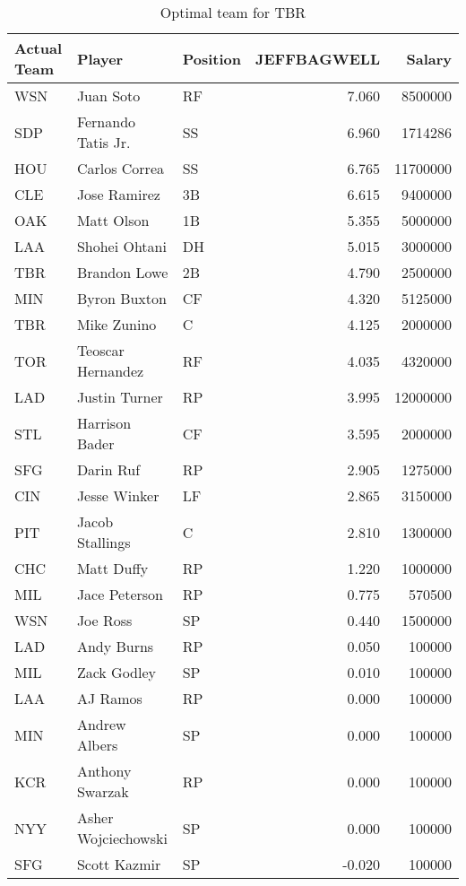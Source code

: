 \begin{table}

\caption{Optimal team for TBR}
\centering
\begin{tabular}[t]{l|l|l|r|r}
\hline
Actual Team & Player & Position & JEFFBAGWELL & Salary\\
\hline
WSN & Juan Soto & RF & 7.060 & 8500000\\
\hline
SDP & Fernando Tatis Jr. & SS & 6.960 & 1714286\\
\hline
HOU & Carlos Correa & SS & 6.765 & 11700000\\
\hline
CLE & Jose Ramirez & 3B & 6.615 & 9400000\\
\hline
OAK & Matt Olson & 1B & 5.355 & 5000000\\
\hline
LAA & Shohei Ohtani & DH & 5.015 & 3000000\\
\hline
TBR & Brandon Lowe & 2B & 4.790 & 2500000\\
\hline
MIN & Byron Buxton & CF & 4.320 & 5125000\\
\hline
TBR & Mike Zunino & C & 4.125 & 2000000\\
\hline
TOR & Teoscar Hernandez & RF & 4.035 & 4320000\\
\hline
LAD & Justin Turner & RP & 3.995 & 12000000\\
\hline
STL & Harrison Bader & CF & 3.595 & 2000000\\
\hline
SFG & Darin Ruf & RP & 2.905 & 1275000\\
\hline
CIN & Jesse Winker & LF & 2.865 & 3150000\\
\hline
PIT & Jacob Stallings & C & 2.810 & 1300000\\
\hline
CHC & Matt Duffy & RP & 1.220 & 1000000\\
\hline
MIL & Jace Peterson & RP & 0.775 & 570500\\
\hline
WSN & Joe Ross & SP & 0.440 & 1500000\\
\hline
LAD & Andy Burns & RP & 0.050 & 100000\\
\hline
MIL & Zack Godley & SP & 0.010 & 100000\\
\hline
LAA & AJ Ramos & RP & 0.000 & 100000\\
\hline
MIN & Andrew Albers & SP & 0.000 & 100000\\
\hline
KCR & Anthony Swarzak & RP & 0.000 & 100000\\
\hline
NYY & Asher Wojciechowski & SP & 0.000 & 100000\\
\hline
SFG & Scott Kazmir & SP & -0.020 & 100000\\
\hline
\end{tabular}
\end{table}
